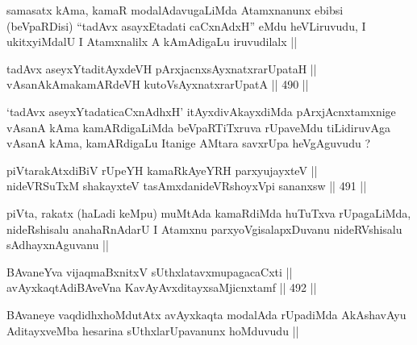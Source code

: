 \begin{artha}
samasatx kAma, kamaR modalAdavugaLiMda Atamxnanunx ebibsi (beVpaRDisi)
``tadAvx asayxEtadati caCxnAdxH'' eMdu heVLiruvudu, I ukitxyiMdalU I
Atamxnalilx A kAmAdigaLu iruvudilalx ||
\end{artha}


\begin{shl}
tadAvx aseyxYtaditAyxdeVH pArxjacnxsAyx\s \s natxrarUpataH || \\
vAsanAkAmakamARdeVH kutoV\s sAyx\s \s natxrarUpatA ||  490 ||  
\end{shl}

\begin{artha}
`tadAvx aseyxYtadaticaCxnAdhxH' itAyxdivAkayxdiMda pArxjAcnxtamxnige
  vAsanA kAma kamARdigaLiMda beVpaRTiTxruva rUpaveMdu tiLidiruvAga
  vAsanA kAma, kamARdigaLu Itanige AMtara savxrUpa heVgAguvudu ?
\end{artha}


\begin{shl}
piVtarakAtxdiBiV rUpeYH kamaRkAyeYRH parxyujayxteV || \\
nideVRSuTxM shakayxteV tasAmxdanideVRshoyxV\s pi sananxsw ||  491 ||  
\end{shl}

\begin{artha}
piVta, rakatx (haLadi keMpu) muMtAda kamaRdiMda huTuTxva rUpagaLiMda,
nideRshisalu anahaRnAdarU I Atamxnu parxyoVgisalapxDuvanu
nideRVshisalu sAdhayxnAguvanu ||
\end{artha}

\begin{shl}
BAvaneYva vijaqmaBxnitxV sUthxlatavxmupagacaCxti || \\
avAyxkaqtAdiBAveVna KavAyAvxditayxsaMjicnxtamf ||  492 ||  
\end{shl}

\begin{artha}
BAvaneye vaqdidhxhoMdutAtx avAyxkaqta modalAda rUpadiMda AkAshavAyu
AditayxveMba hesarina sUthxlarUpavanunx hoMduvudu ||
\end{artha}



